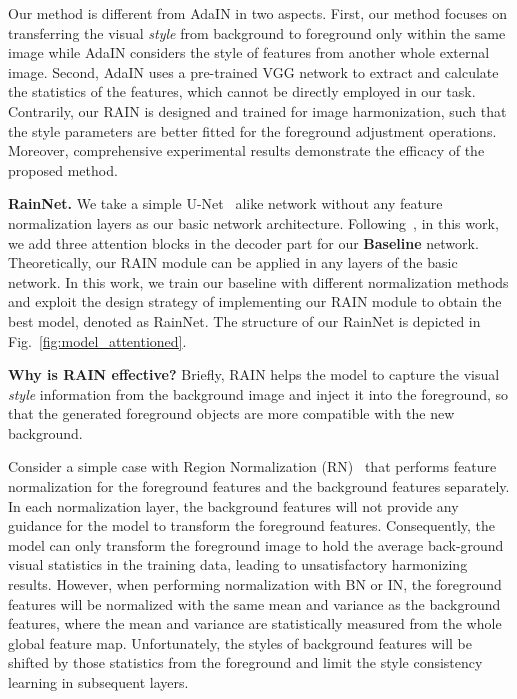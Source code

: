 \documentclass[final]{cvpr}
\begin{document}
Our method is different from AdaIN in two aspects. First, our method focuses on transferring the visual \emph{style} from background to foreground only within the same image while AdaIN considers the style of features from another whole external image. Second, AdaIN uses a pre-trained VGG network to extract and calculate the statistics of the features, which cannot be directly employed in our task. Contrarily, our RAIN is designed and trained for image harmonization, such that the style parameters are better fitted for the foreground adjustment operations. Moreover, comprehensive experimental results demonstrate the efficacy of the proposed method. 


\noindent
\textbf{RainNet.} We take a simple U-Net~\cite{ronneberger2015u,isola2017image} alike network without any feature normalization layers as our basic network architecture. Following~\cite{cong2020dovenet,cun2020improving}, in this work, we add three attention blocks in the decoder part for our \textbf{Baseline} network. Theoretically, our RAIN module can be applied in any layers of the basic network. In this work, we train our baseline with different normalization methods and exploit the design strategy of implementing our RAIN module to obtain the best model, denoted as RainNet. The structure of our RainNet is depicted in Fig.~\ref{fig:model_attentioned}. 


\noindent
\textbf{Why is RAIN effective?} Briefly, RAIN helps the model to capture the visual \emph{style} information from the background image and inject it into the foreground, so that the generated foreground objects are more compatible with the new background. 

Consider a simple case with Region Normalization (RN)~\cite{yu2020region} that performs feature normalization for the foreground features and the background features separately. In each normalization layer, the background features will not provide any guidance for the model to transform the foreground features. Consequently, the model can only transform the foreground image to hold the average back-ground visual statistics in the training data, leading to unsatisfactory harmonizing results. However, when performing normalization with BN or IN, the foreground features will be normalized with the same mean and variance as the background features, where the mean and variance are statistically measured from the whole global feature map. Unfortunately, the styles of background features will be shifted by those statistics from the foreground and limit the style consistency learning in subsequent layers. 
\end{document}
